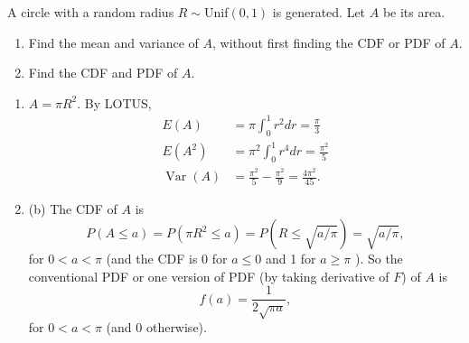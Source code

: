 

\setcounter{theorem}{4}
\begin{exercise}[BH.5.5] A circle with a random radius $R \sim${Unif}$(0,1)$ is generated. Let $A$ be its area.
	\begin{enumerate}
		\item Find the mean and variance of $A$, without first finding the $\mathrm{CDF}$ or PDF of $A$.
		\item Find the CDF and PDF of $A$.
	\end{enumerate}  
\begin{solution}
    \begin{enumerate}
        \item $A=\pi R^2$. By LOTUS,
        $$
        \begin{aligned}
            E(A) &=\pi \int_0^1 r^2 d r=\frac{\pi}{3} \\
            E\left(A^2\right) &=\pi^2 \int_0^1 r^4 d r=\frac{\pi^2}{5} \\
            \operatorname{Var}(A) &=\frac{\pi^2}{5}-\frac{\pi^2}{9}=\frac{4 \pi^2}{45} .
        \end{aligned}
        $$
        \item  (b) The CDF of $A$ is
        $$
        P(A \leq a)=P\left(\pi R^2 \leq a\right)=P(R \leq \sqrt{a / \pi})=\sqrt{a / \pi},
        $$
        for $0<a<\pi$ (and the CDF is 0 for $a \leq 0$ and 1 for $a \geq \pi$ ). So the conventional PDF or one version of PDF (by taking derivative of $F$) of $A$ is
        $$
        f(a)=\frac{1}{2 \sqrt{\pi a}},
        $$
        for $0<a<\pi$ (and 0 otherwise).
    \end{enumerate}
\end{solution}
\end{exercise}


